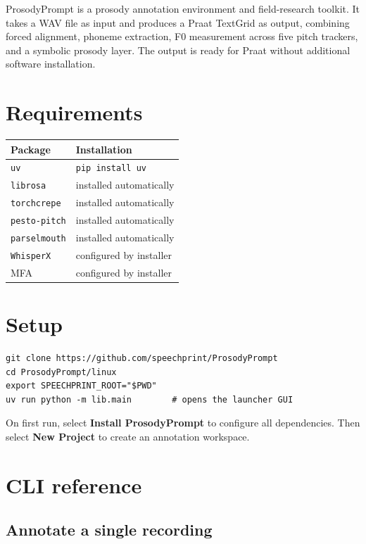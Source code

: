 \medskip

ProsodyPrompt is a prosody annotation environment and field-research toolkit.
It takes a WAV file as input and produces a Praat TextGrid as output,
combining forced alignment, phoneme extraction, F0 measurement across five
pitch trackers, and a symbolic prosody layer. The output is ready for Praat
without additional software installation.

\section*{Requirements}

\begin{center}
\small
\begin{tabular}{ll}
\toprule
Package & Installation \\
\midrule
\texttt{uv} & \texttt{pip install uv} \\
\texttt{librosa} & installed automatically \\
\texttt{torchcrepe} & installed automatically \\
\texttt{pesto-pitch} & installed automatically \\
\texttt{parselmouth} & installed automatically \\
\texttt{WhisperX} & configured by installer \\
MFA & configured by installer \\
\bottomrule
\end{tabular}
\end{center}

\section*{Setup}

\begin{verbatim}
git clone https://github.com/speechprint/ProsodyPrompt
cd ProsodyPrompt/linux
export SPEECHPRINT_ROOT="$PWD"
uv run python -m lib.main        # opens the launcher GUI
\end{verbatim}

On first run, select \textbf{Install ProsodyPrompt} to configure all
dependencies. Then select \textbf{New Project} to create an annotation
workspace.

\section*{CLI reference}

\subsection*{Annotate a single recording}

